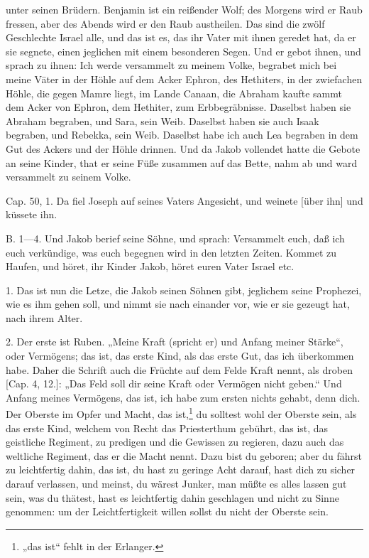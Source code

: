 unter seinen Brüdern. Benjamin ist ein reißender Wolf; des Morgens wird er Raub fressen, aber des Abends wird er den Raub austheilen. Das sind die zwölf Geschlechte Israel alle, und das ist es, das ihr Vater mit ihnen geredet hat, da er sie segnete, einen jeglichen mit einem besonderen Segen. Und er gebot ihnen, und sprach zu ihnen: Ich werde versammelt zu meinem Volke, begrabet mich bei meine Väter in der Höhle auf dem Acker Ephron, des Hethiters, in der zwiefachen Höhle, die gegen Mamre liegt, im Lande Canaan, die Abraham kaufte sammt dem Acker von Ephron, dem Hethiter, zum Erbbegräbnisse. Daselbst haben sie Abraham begraben, und Sara, sein Weib. Daselbst haben sie auch Isaak begraben, und Rebekka, sein Weib. Daselbst habe ich auch Lea begraben in dem Gut des Ackers und der Höhle drinnen. Und da Jakob vollendet hatte die Gebote an seine Kinder, that er seine Füße zusammen auf das Bette, nahm ab und ward versammelt zu seinem Volke.

Cap. 50, 1. Da fiel Joseph auf seines Vaters Angesicht, und weinete [über ihn] und küssete ihn.

B. 1—4. Und Jakob berief seine Söhne, und sprach: Versammelt euch, daß ich euch verkündige, was euch begegnen wird in den letzten Zeiten. Kommet zu Haufen, und höret, ihr Kinder Jakob, höret euren Vater Israel etc.

1. Das ist nun die Letze, die Jakob seinen Söhnen gibt, jeglichem seine Prophezei, wie es ihm gehen soll, und nimmt sie nach einander vor, wie er sie gezeugt hat, nach ihrem Alter.

2. Der erste ist Ruben. „Meine Kraft (spricht er) und Anfang meiner Stärke“, oder Vermögens; das ist, das erste Kind, als das erste Gut, das ich überkommen habe. Daher die
Schrift auch die Früchte auf dem Felde Kraft nennt, als droben [Cap. 4, 12.]: „Das Feld soll dir seine Kraft oder Vermögen nicht geben.“ Und Anfang meines Vermögens, das ist, ich habe zum ersten nichts gehabt, denn dich. Der Oberste im Opfer und Macht, das ist,\footnote{„das ist“ fehlt in der Erlanger.} du solltest wohl der Oberste sein, als das erste Kind, welchem von Recht das Priesterthum gebührt, das ist, das geistliche Regiment, zu predigen und die Gewissen zu regieren, dazu auch das weltliche Regiment, das er die Macht nennt. Dazu bist du geboren; aber du fährst zu leichtfertig dahin, das ist, du hast zu geringe Acht darauf, hast dich zu sicher darauf verlassen, und meinst, du wärest Junker, man müßte es alles lassen gut sein, was du thätest, hast es leichtfertig dahin geschlagen und nicht zu Sinne genommen: um der Leichtfertigkeit willen sollst du nicht der Oberste sein.

